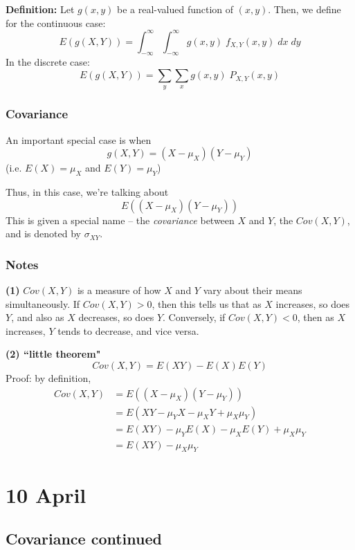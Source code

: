 \documentclass[12pt]{article}
\begin{document}
\textbf{Definition:} Let $g(x,y)$ be a real-valued function of $(x,y)$. Then, we define for the continuous case:
\[
    E(g(X,Y)) = \int_{-\infty}^{\infty} \int_{-\infty}^{\infty} g(x,y) \; f_{X,Y} (x,y) \; dx \; dy
\]
In the discrete case:
\[
    E(g(X,Y)) = \sum_y \sum_x g(x,y) \; P_{X,Y} (x,y)
\]

\subsubsection{Covariance}
An important special case is when 
\[
    g(X,Y) = (X - \mu_X)(Y - \mu_Y)
\]
(i.e. $E(X) = \mu_X$ and $E(Y) = \mu_Y$)

Thus, in this case, we're talking about
\[
    E((X - \mu_X)(Y - \mu_Y))
\]
This is given a special name -- the \emph{covariance} between $X$ and $Y$, the $Cov(X,Y)$, and is denoted by $\sigma_{XY}$.

\subsubsection{Notes}
\textbf{(1)} $Cov(X,Y)$ is a measure of how $X$ and $Y$ vary about their means simultaneously. If $Cov(X,Y) > 0$, then this tells us that as $X$ increases, so does $Y$, and also as $X$ decreases, so does $Y$. Conversely, if $Cov(X,Y) < 0$, then as $X$ increases, $Y$ tends to decrease, and vice versa.

\textbf{(2) ``little theorem"} 
\[
    Cov(X,Y) = E(XY) - E(X) E(Y)
\]
Proof: by definition, 
\begin{align*}
    Cov(X,Y) &= E((X - \mu_X)(Y - \mu_Y)) \\
        &= E(XY - \mu_Y X - \mu_X Y + \mu_X \mu_Y) \\
        &= E(XY) - \mu_Y E(X) - \mu_X E(Y) + \mu_X \mu_Y \\
        &= E(XY) - \mu_X \mu_Y
\end{align*}

\section{10 April}
\subsection{Covariance continued}
\end{document}
